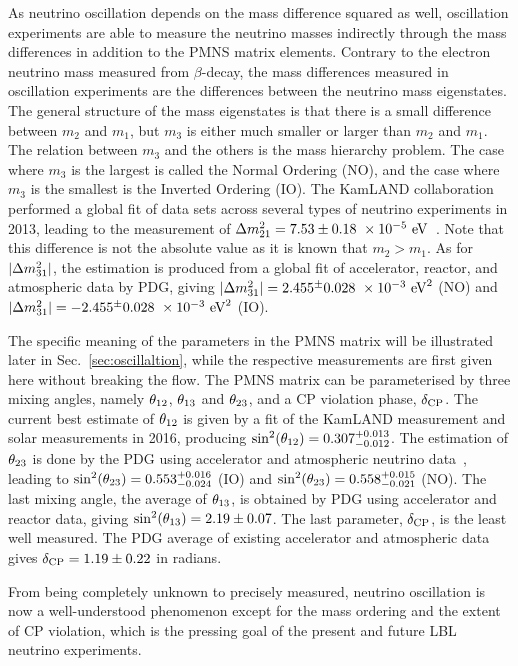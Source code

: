 As neutrino oscillation depends on the mass difference squared as well, oscillation experiments are able to measure the neutrino masses indirectly through the mass differences in addition to the PMNS matrix elements.
Contrary to the electron neutrino mass measured from $\beta$-decay, the mass differences measured in oscillation experiments are the differences between the neutrino mass eigenstates.
The general structure of the mass eigenstates is that there is a small difference between $m_2$ and $m_1$, but $m_3$ is either much smaller or larger than $m_2$ and $m_1$.
The relation between $m_3$ and the others is the mass hierarchy problem.
The case where $m_3$ is the largest is called the Normal Ordering (NO), and the case where $m_3$ is the smallest is the Inverted Ordering (IO).
The KamLAND collaboration performed a global fit of data sets across several types of neutrino experiments in 2013, leading to the measurement of $\Delta m^2_{21}=7.53\pm0.18~\times 10^{-5}~\textrm{eV}$~\cite{KamLAND:2013rgu}.
Note that this difference is not the absolute value as it is known that $m_2>m_1$.
As for $|\Delta m^2_{31}|$, the estimation is produced from a global fit of accelerator, reactor, and atmospheric data by PDG, giving $|\Delta m^2_{31}|=2.455^\pm0.028~\times 10^{-3}~\textrm{eV}^2$ (NO) and $|\Delta m^2_{31}|=-2.455^\pm0.028~\times 10^{-3}~\textrm{eV}^2$ (IO).

The specific meaning of the parameters in the PMNS matrix will be illustrated later in Sec.~\ref{sec:oscillaltion}, while the respective measurements are first given here without breaking the flow.
The PMNS matrix can be parameterised by three mixing angles, namely $\theta_{12}$, $\theta_{13}$ and $\theta_{23}$, and a CP violation phase, $\delta_\textrm{CP}$.
The current best estimate of $\theta_{12}$ is given by a fit of the KamLAND measurement and solar measurements in 2016, producing $\sin^2(\theta_{12})=0.307^{+0.013}_{-0.012}$.
The estimation of $\theta_{23}$ is done by the PDG using accelerator and atmospheric neutrino data~\cite{ParticleDataGroup:2024cfk}, leading to $\sin^2(\theta_{23})=0.553^{+0.016}_{-0.024}$ (IO) and $\sin^2(\theta_{23})=0.558^{+0.015}_{-0.021}$ (NO).
The last mixing angle, the average of $\theta_{13}$, is obtained by PDG using accelerator and reactor data, giving $\sin^2(\theta_{13})=2.19\pm0.07$.
The last parameter, $\delta_\textrm{CP}$, is the least well measured.
The PDG average of existing accelerator and atmospheric data gives $\delta_\textrm{CP}=1.19\pm0.22$ in radians.

From being completely unknown to precisely measured, neutrino oscillation is now a well-understood phenomenon except for the mass ordering and the extent of CP violation, which is the pressing goal of the present and future LBL neutrino experiments.
 
